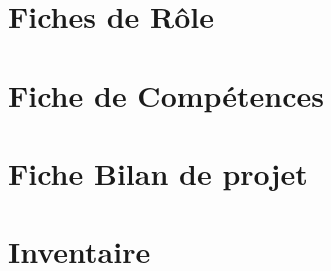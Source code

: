 \documentclass[asi]{picInsa}
\begin{document}
\begin{appendix}
\chapter{Fiches de Rôle}
\label{annexeFRo}
	

\chapter{Fiche de Compétences}
\label{annexeFC}


\chapter{Fiche Bilan de projet}


\chapter{Inventaire}
\label{annexeInventaire}

	
\listoffigures
{}
	 
\listoftables
{}
\end{appendix}
\pageQuatriemeCouverture
\end{document}
